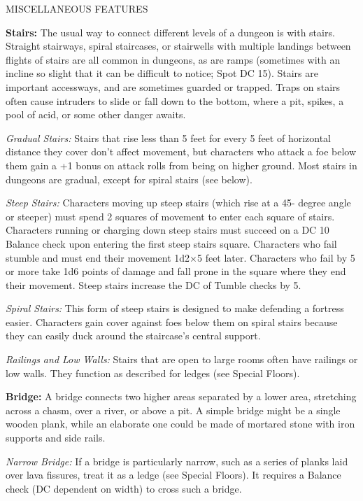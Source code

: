 \documentclass{article}
\begin{document}
\vspace{12pt}
{\large{}MISCELLANEOUS FEATURES}

\textbf{Stairs:} The usual way to connect different levels of a dungeon is with 
stairs. Straight stairways, spiral staircases, or stairwells with multiple landings 
between flights of stairs are all common in dungeons, as are ramps (sometimes with 
an incline so slight that it can be difficult to notice; Spot DC 15). Stairs are 
important accessways, and are sometimes guarded or trapped. Traps on stairs often 
cause intruders to slide or fall down to the bottom, where a pit, spikes, a pool 
of acid, or some other danger awaits.

\textit{Gradual Stairs: }Stairs that rise less than 5 feet for every 5 feet of 
horizontal distance they cover don't affect movement, but characters who attack 
a foe below them gain a +1 bonus on attack rolls from being on higher ground. Most 
stairs in dungeons are gradual, except for spiral stairs (see below).

\textit{Steep Stairs: }Characters moving up steep stairs (which rise at a 45- degree 
angle or steeper) must spend 2 squares of movement to enter each square of stairs. 
Characters running or charging down steep stairs must succeed on a DC 10 Balance 
check upon entering the first steep stairs square. Characters who fail stumble 
and must end their movement 1d2\ensuremath{\times}5 feet later. Characters who 
fail by 5 or more take 1d6 points of damage and fall prone in the square where 
they end their movement. Steep stairs increase the DC of Tumble checks by 5.

\textit{Spiral Stairs: }This form of steep stairs is designed to make defending 
a fortress easier. Characters gain cover against foes below them on spiral stairs 
because they can easily duck around the staircase's central support.

\textit{Railings and Low Walls: }Stairs that are open to large rooms often have 
railings or low walls. They function as described for ledges (see Special Floors).

\textbf{Bridge: }A bridge connects two higher areas separated by a lower area, 
stretching across a chasm, over a river, or above a pit. A simple bridge might 
be a single wooden plank, while an elaborate one could be made of mortared stone 
with iron supports and side rails.

\textit{Narrow Bridge: }If a bridge is particularly narrow, such as a series of 
planks laid over lava fissures, treat it as a ledge (see Special Floors). It requires 
a Balance check (DC dependent on width) to cross such a bridge.
\end{document}
